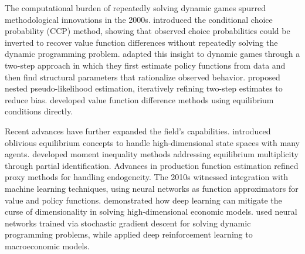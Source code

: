 The computational burden of repeatedly solving dynamic games spurred methodological innovations in the 2000s. \citet{HotzMiller1993} introduced the conditional choice probability (CCP) method, showing that observed choice probabilities could be inverted to recover value function differences without repeatedly solving the dynamic programming problem. \citet{BajariBenkardLevin2007} adapted this insight to dynamic games through a two-step approach in which they first estimate policy functions from data and then find structural parameters that rationalize observed behavior. \citet{AguirregabiriaMira2007} proposed nested pseudo-likelihood estimation, iteratively refining two-step estimates to reduce bias. \citet{PesendorferSchmidtDengler2008} developed value function difference methods using equilibrium conditions directly.

Recent advances have further expanded the field's capabilities. \citet{WeintraubBenkardVanRoy2008} introduced oblivious equilibrium concepts to handle high-dimensional state spaces with many agents. \citet{CilibertoTamer2009} developed moment inequality methods addressing equilibrium multiplicity through partial identification. Advances in production function estimation \citep{AckerbergCavesFrazer2015} refined proxy methods for handling endogeneity. The 2010s witnessed integration with machine learning techniques, using neural networks as function approximators for value and policy functions. \citet{FernandezVillaverdeNunoPerla2024} demonstrated how deep learning can mitigate the curse of dimensionality in solving high-dimensional economic models. \citet{MaliarMaliarWinant2021} used neural networks trained via stochastic gradient descent for solving dynamic programming problems, while \citet{AtashbarShi2023} applied deep reinforcement learning to macroeconomic models.
